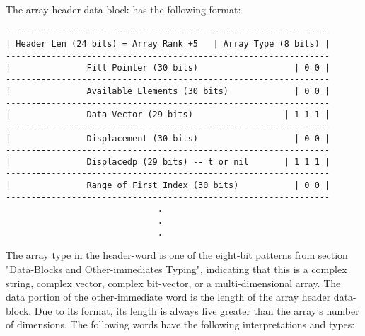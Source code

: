 The array-header data-block has the following format:
\begin{verbatim}
----------------------------------------------------------------
| Header Len (24 bits) = Array Rank +5   | Array Type (8 bits) |
----------------------------------------------------------------
|               Fill Pointer (30 bits)                   | 0 0 | 
----------------------------------------------------------------
|               Available Elements (30 bits)             | 0 0 | 
----------------------------------------------------------------
|               Data Vector (29 bits)                  | 1 1 1 | 
----------------------------------------------------------------
|               Displacement (30 bits)                   | 0 0 | 
----------------------------------------------------------------
|               Displacedp (29 bits) -- t or nil       | 1 1 1 | 
----------------------------------------------------------------
|               Range of First Index (30 bits)           | 0 0 | 
----------------------------------------------------------------
                              .
                              .
                              .

\end{verbatim}
The array type in the header-word is one of the eight-bit patterns from section
"Data-Blocks and Other-immediates Typing", indicating that this is a complex
string, complex vector, complex bit-vector, or a multi-dimensional array.  The
data portion of the other-immediate word is the length of the array header
data-block.  Due to its format, its length is always five greater than the
array's number of dimensions.  The following words have the following
interpretations and types:
